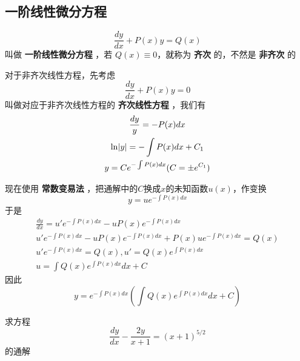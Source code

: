 \documentclass[11pt]{article}
\begin{document}
\subsection{一阶线性微分方程}
\label{sec:org9480b16}
\begin{equation*}
\frac{dy}{dx}+P(x)y=Q(x)
\end{equation*}
叫做 \textbf{一阶线性微分方程} ，若 \(Q(x)\equiv0\)，就称为  \textbf{齐次} 的，不然是 \textbf{非齐次}
的

对于非齐次线性方程，先考虑
\begin{equation*}
\frac{dy}{dx}+P(x)y=0
\end{equation*}
叫做对应于非齐次线性方程的 \textbf{齐次线性方程} ，我们有
\begin{gather*}
\frac{dy}{y}=-P(x)dx\\
\ln\abs{y}=-\int P(x)dx+C_1\\
y=Ce^{-\int P(x)dx}(C=\pm e^{C_1})
\end{gather*}

现在使用 \textbf{常数变易法} ，把通解中的\(C\)换成\(x\)的未知函数\(u(x)\)，作变换
\begin{equation*}
y=ue^{-\int P(x)dx}
\end{equation*}
于是
\begin{gather*}
\frac{dy}{dx}=u'e^{-\int P(x)dx}-uP(x)e^{-\int P(x)dx}\\
u'e^{-\int P(x)dx}-uP(x)e^{-\int P(x)dx}+P(x)ue^{-\int P(x)dx}=Q(x)\\
u'e^{-\int P(x)dx}=Q(x),u'=Q(x)e^{\int P(x)dx}\\
u=\int Q(x)e^{\int P(x)dx}dx+C
\end{gather*}
因此
\begin{equation*}
y=e^{-\int P(x)dx}   (\int Q(x)e^{\int P(x)dx}dx+C)
\end{equation*}

\begin{proposition}[]
求方程
\begin{equation*}
\frac{dy}{dx}-\frac{2y}{x+1}=(x+1)^{5/2}
\end{equation*}
的通解
\end{proposition}
\end{document}
